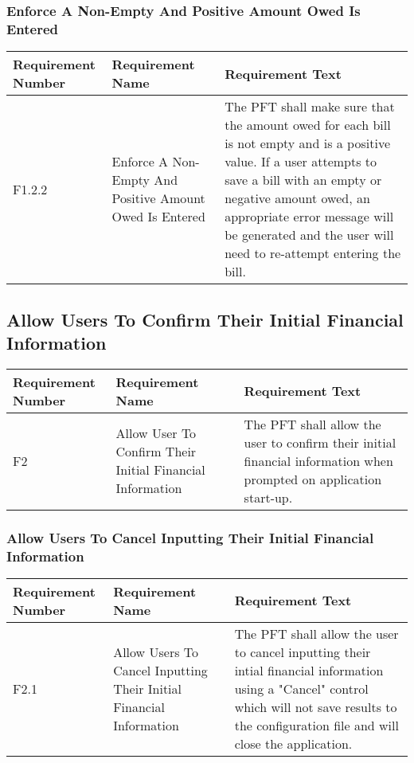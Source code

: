 \documentclass{article}
\begin{document}
\subsubsection{Enforce A Non-Empty And Positive Amount Owed Is Entered}

\begin{longtable}{|p{2cm}|p{6cm}| p{6cm}|}
    \hline
    \textbf{Requirement Number} & \textbf{Requirement Name} & \textbf{Requirement Text}\\
    \hline
    F1.2.2 & Enforce A Non-Empty And Positive Amount Owed Is Entered & The PFT shall make sure that the amount owed for each bill is not empty and is a positive value. If a user attempts to save a bill with an empty or negative amount owed, an appropriate error message will be generated and the user will need to re-attempt entering the bill. \\
    \hline
\end{longtable}

\subsection{Allow Users To Confirm Their Initial Financial Information}

\begin{longtable}{|p{2cm}|p{6cm}| p{6cm}|}
    \hline
    \textbf{Requirement Number} & \textbf{Requirement Name} & \textbf{Requirement Text}\\
    \hline
    F2 & Allow User To Confirm Their Initial Financial Information & The PFT shall allow the user to confirm their initial financial information when prompted on application start-up.  \\
    \hline
\end{longtable}

\subsubsection{Allow Users To Cancel Inputting Their Initial Financial Information}

\begin{longtable}{|p{2cm}|p{6cm}| p{6cm}|}
    \hline
    \textbf{Requirement Number} & \textbf{Requirement Name} & \textbf{Requirement Text}\\
    \hline
    F2.1 & Allow Users To Cancel Inputting Their Initial Financial Information & The PFT shall allow the user to cancel inputting their intial financial information using a "Cancel" control which will not save results to the configuration file and will close the application.  \\
    \hline
\end{longtable}
\end{document}
